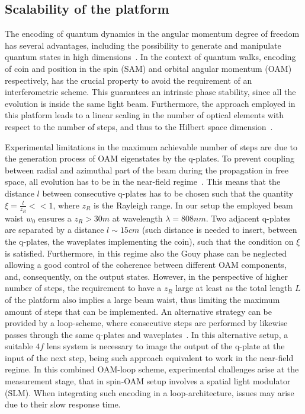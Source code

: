 \subsection{Scalability of the platform}
The encoding of quantum dynamics in the angular momentum degree of freedom has several advantages, including the possibility to generate and manipulate quantum states in high dimensions~\cite{zeilengerOAM,dambrosio_gear2013}. In the context of quantum walks, encoding of coin and position in the spin (SAM) and orbital angular momentum (OAM) respectively, has the crucial property to avoid the requirement of an interferometric scheme. This guarantees an intrinsic phase stability, since all the evolution is inside the same light beam. Furthermore, the approach employed in this platform leads to a linear scaling in the number of optical elements with respect to the number of steps, and thus to the Hilbert space dimension~\cite{cardano2015quantum}.

Experimental limitations in the maximum achievable number of steps 
are due to the generation process of OAM eigenstates by the q-plates. To prevent coupling between radial and azimuthal part of the beam during the propagation in free space, all evolution has to be in the near-field regime~\cite{karimi2009, cardano2015quantum}. This means that the distance $l$ between consecutive q-plates has to be chosen such that the quantity $\xi=\frac{l}{z_R}< < 1 $, where $z_R$ is the Rayleigh range.
In our setup the employed beam waist $w_0$  ensures a $z_R> 30 m$ at wavelength $\lambda=808 nm$. Two adjacent q-plates are separated by a distance $l \sim 15 cm$ (such distance is needed to insert, between the q-plates, the waveplates implementing the coin), such that the condition on $\xi$ is satisfied.  Furthermore, in this regime also the Gouy phase can be neglected allowing a good control of the coherence between different OAM components, and, consequently, on the output states. However, in the perspective of higher number of steps, the requirement to have a $z_R$ large at least as the total length $L$ of the platform also implies a large beam waist, thus limiting the maximum amount of steps that can be implemented. An alternative strategy can be provided by a loop-scheme, where consecutive steps are performed by likewise passes through the same q-plates and waveplates~\cite{goyal2013implementing}. In this alternative setup, a suitable $4f$ lens system is necessary to image the output of the q-plate at the input of the next step, being such approach equivalent to work in the near-field regime.  
In this combined OAM-loop scheme, experimental challenges arise at the measurement stage, that in spin-OAM setup involves a spatial light modulator (SLM). When integrating such encoding in a loop-architecture, issues may arise due to their slow response time.


